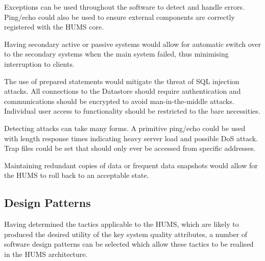 \documentclass[10pt,a4paper]{article}
\begin{document}
\begin{description}
\begin{description}[noitemsep]
	\item[Fault Detection] Exceptions can be used throughout the software to detect and handle errors. Ping/echo could also be used to ensure external components are correctly registered with the HUMS core.
	\item[Fault Recovery] Having secondary active or passive systems would allow for automatic switch over to the secondary systems when the main system failed, thus minimising interruption to clients.
	\end{description}
\item[Security] \hfill
	\begin{description}[noitemsep]
	\item[Resisting Attacks] The use of prepared statements would mitigate the threat of SQL injection attacks. All connections to the Datastore should require authentication and communications should be encrypted to avoid man-in-the-middle attacks. Individual user access to functionality should be restricted to the bare necessities. 
	\item[Detecting Attacks] Detecting attacks can take many forms. A primitive ping/echo could be used with length response times indicating heavy server load and possible DoS attack. Trap files could be set that should only ever be accessed from specific addresses.
	\item[Recovering From Attacks] Maintaining redundant copies of data or frequent data snapshots would allow for the HUMS to roll back to an acceptable state.
	\end{description}
\end{description}

\subsection{Design Patterns}
Having determined the tactics applicable to the HUMS, which are likely to produced the desired utility of the key system quality attributes, a number of software design patterns can be selected which allow these tactics to be realised in the HUMS architecture.
\end{document}
